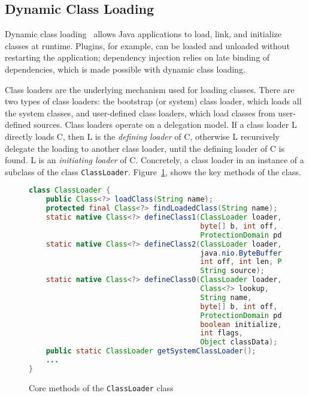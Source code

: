 \subsection{Dynamic Class Loading}\label{dynamic_class_loading}
Dynamic class loading~\cite{liang_dynamic_1998} allows Java applications to load, link, and initialize classes at runtime. Plugins, for example, can be loaded and unloaded without restarting the application; dependency injection relies on late binding of dependencies, which is made possible with dynamic class loading. 

Class loaders are the underlying mechanism used for loading classes. 
There are two types of class loaders: the bootstrap (or system) class loader, which loads all the system classes, and user-defined class loaders, which load classes from user-defined sources.
Class loaders operate on a delegation model. If a class loader L directly loads C, then L is the \emph{defining loader} of C, otherwise L recursively delegate the loading to another class loader, until the defining loader of C is found. L is an \emph{initiating loader} of C. 
Concretely, a class loader in an instance of a subclass of the class \verb|ClassLoader|. 
Figure~\ref{fig:classloader}, shows the key methods of the class.

\begin{figure}[ht]
    \centering
\begin{lstlisting}[language=Java]
class ClassLoader {
    public Class<?> loadClass(String name);
    protected final Class<?> findLoadedClass(String name);
    static native Class<?> defineClass1(ClassLoader loader, String name, 
                                        byte[] b, int off, int len,
                                        ProtectionDomain pd, String source);
    static native Class<?> defineClass2(ClassLoader loader, String name, 
                                        java.nio.ByteBuffer b,
                                        int off, int len, ProtectionDomain pd,
                                        String source);
    static native Class<?> defineClass0(ClassLoader loader,
                                        Class<?> lookup,
                                        String name,
                                        byte[] b, int off, int len,
                                        ProtectionDomain pd,
                                        boolean initialize,
                                        int flags,
                                        Object classData);
    public static ClassLoader getSystemClassLoader();
    ...
}
\end{lstlisting}
    \caption{Core methods of the \texttt{ClassLoader} class}
    \label{fig:classloader}
\end{figure}


